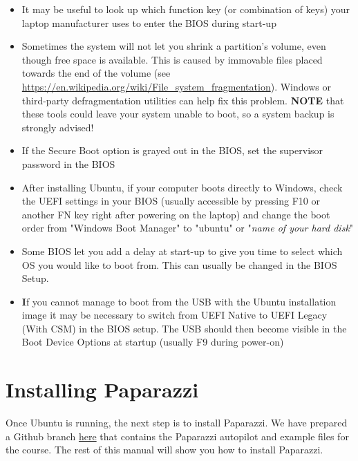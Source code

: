 \begin{itemize}
  \item It may be useful to look up which function key (or combination of keys) your laptop manufacturer uses to enter the BIOS during start-up
  
  \item Sometimes the system will not let you shrink a partition's volume, even though free space is available. This is caused by immovable files placed towards the end of the volume (see \url{https://en.wikipedia.org/wiki/File\_system\_fragmentation}). Windows or third-party defragmentation utilities can help fix this problem. \textbf{NOTE} that these tools could leave your system unable to boot, so a system backup is strongly advised!
  
  \item If the Secure Boot option is grayed out in the BIOS, set the supervisor password in the BIOS
  
  \item After installing Ubuntu, if your computer boots directly to Windows, check the UEFI settings in your BIOS (usually accessible by pressing F10 or another FN key right after powering on the laptop) and change the boot order from "Windows Boot Manager" to "ubuntu" or "\textit{name of your hard disk}"
  
  \item Some BIOS let you add a delay at start-up to give you time to select which OS you would like to boot from. This can usually be changed in the BIOS Setup.
  
  \item \textbf If you cannot manage to boot from the USB with the Ubuntu installation image it may be necessary to switch from UEFI Native to UEFI Legacy (With CSM) in the BIOS setup. The USB should then become visible in the Boot Device Options at startup (usually F9 during power-on)
\end{itemize}


\section{Installing Paparazzi}\label{sec:install}
Once Ubuntu is running, the next step is to install Paparazzi.
We have prepared a Github branch \href{https://github.com/tudelft/paparazzi/tree/\coursebranch}{here} that contains the Paparazzi autopilot and example files for the course. The rest of this manual will show you how to install Paparazzi.


